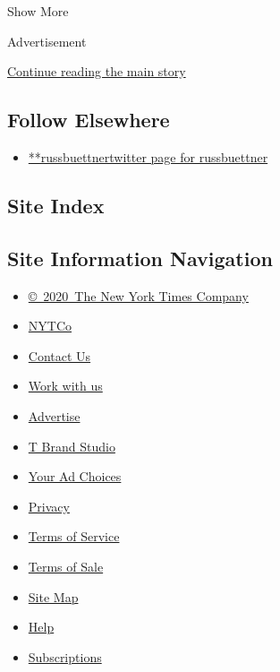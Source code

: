 Show More

Advertisement

\protect\hyperlink{after-mid2}{Continue reading the main story}

\hypertarget{follow-elsewhere}{%
\subsection{Follow Elsewhere}\label{follow-elsewhere}}

\begin{itemize}
\tightlist
\item
  \href{https://twitter.com/russbuettner}{**russbuettnertwitter page for
  russbuettner}
\end{itemize}

\hypertarget{site-index}{%
\subsection{Site Index}\label{site-index}}

\hypertarget{site-information-navigation}{%
\subsection{Site Information
Navigation}\label{site-information-navigation}}

\begin{itemize}
\tightlist
\item
  \href{https://help.nytimes.com/hc/en-us/articles/115014792127-Copyright-notice}{©~2020~The
  New York Times Company}
\end{itemize}

\begin{itemize}
\tightlist
\item
  \href{https://www.nytco.com/}{NYTCo}
\item
  \href{https://help.nytimes.com/hc/en-us/articles/115015385887-Contact-Us}{Contact
  Us}
\item
  \href{https://www.nytco.com/careers/}{Work with us}
\item
  \href{https://nytmediakit.com/}{Advertise}
\item
  \href{http://www.tbrandstudio.com/}{T Brand Studio}
\item
  \href{https://www.nytimes.com/privacy/cookie-policy\#how-do-i-manage-trackers}{Your
  Ad Choices}
\item
  \href{https://www.nytimes.com/privacy}{Privacy}
\item
  \href{https://help.nytimes.com/hc/en-us/articles/115014893428-Terms-of-service}{Terms
  of Service}
\item
  \href{https://help.nytimes.com/hc/en-us/articles/115014893968-Terms-of-sale}{Terms
  of Sale}
\item
  \href{https://spiderbites.nytimes.com}{Site Map}
\item
  \href{https://help.nytimes.com/hc/en-us}{Help}
\item
  \href{https://www.nytimes.com/subscription?campaignId=37WXW}{Subscriptions}
\end{itemize}
